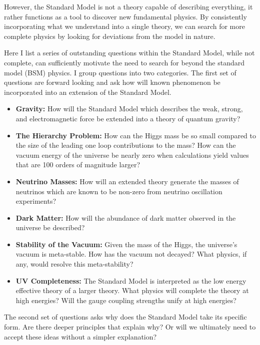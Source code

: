 However, the Standard Model is not a theory capable of describing everything, 
it rather functions as a tool to discover new fundamental physics. By consistently incorporating what we 
understand into a single theory, we can search for more complete physics by looking for deviations from 
the model in nature. 

Here I list a series of outstanding questions within the Standard Model, while not complete, can sufficiently 
motivate the need to search for beyond the standard model (BSM) physics. I group questions into two categories.
The first set of questions are forward looking and ask how will known phenomenon be incorporated into 
an extension of the Standard Model.
\begin{itemize}
\item \textbf{Gravity:} How will the Standard Model which describes the weak, strong, and electromagnetic force
be extended into a theory of quantum gravity?
\item \textbf{The Hierarchy Problem:} How can the Higgs mass be so small compared to the size of the leading one loop
contributions to the mass? How can the vacuum energy of the universe be nearly zero when calculations yield
values that are 100 orders of magnitude larger? 
\item \textbf{Neutrino Masses:} How will an extended theory
 generate the masses of neutrinos which are known to be non-zero
 from neutrino oscillation experiments?
\item \textbf{Dark Matter:} How will the abundance of dark matter observed in the universe be described?
\item \textbf{Stability of the Vacuum:} Given the mass of the Higgs, the universe's vacuum is meta-stable. 
How has the vacuum not decayed? What physics, if any, would resolve this meta-stability?
\item \textbf{UV Completeness:} The Standard Model is interpreted as the low energy effective theory
of a larger theory. What physics will complete the theory at high energies? Will the gauge coupling strengths unify at high energies? 
\end{itemize}
The second set of questions asks why does the Standard Model take its specific form. Are there deeper
principles that explain why? Or will we ultimately need to accept these ideas without a simpler explanation?
